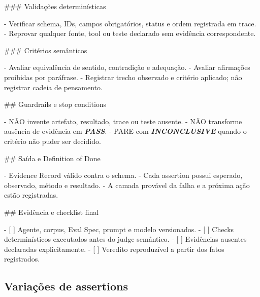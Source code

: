\documentclass[
  10pt,
  a4paper,
  oneside]{book}
\newenvironment{Shaded}{}{}
\newcommand{\FunctionTok}[1]{\textcolor[rgb]{0.02,0.16,0.49}{#1}}
\newcommand{\InformationTok}[1]{\textcolor[rgb]{0.38,0.63,0.69}{\textbf{\textit{#1}}}}
\newcommand{\NormalTok}[1]{#1}
\newcommand{\SpecialStringTok}[1]{\textcolor[rgb]{0.73,0.40,0.53}{#1}}
\newcommand{\VariableTok}[1]{\textcolor[rgb]{0.10,0.09,0.49}{#1}}
\begin{document}
\begin{Shaded}
\begin{Highlighting}[]
\FunctionTok{\#\#\# Validações determinísticas}

\SpecialStringTok{{-} }\NormalTok{Verificar schema, IDs, campos obrigatórios, status e ordem registrada em trace.}
\SpecialStringTok{{-} }\NormalTok{Reprovar qualquer fonte, tool ou teste declarado sem evidência correspondente.}

\FunctionTok{\#\#\# Critérios semânticos}

\SpecialStringTok{{-} }\NormalTok{Avaliar equivalência de sentido, contradição e adequação.}
\SpecialStringTok{{-} }\NormalTok{Avaliar afirmações proibidas por paráfrase.}
\SpecialStringTok{{-} }\NormalTok{Registrar trecho observado e critério aplicado; não registrar cadeia de pensamento.}

\FunctionTok{\#\# Guardrails e stop conditions}

\SpecialStringTok{{-} }\NormalTok{NÃO invente artefato, resultado, trace ou teste ausente.}
\SpecialStringTok{{-} }\NormalTok{NÃO transforme ausência de evidência em }\InformationTok{\textasciigrave{}PASS\textasciigrave{}}\NormalTok{.}
\SpecialStringTok{{-} }\NormalTok{PARE com }\InformationTok{\textasciigrave{}INCONCLUSIVE\textasciigrave{}}\NormalTok{ quando o critério não puder ser decidido.}

\FunctionTok{\#\# Saída e Definition of Done}

\SpecialStringTok{{-} }\NormalTok{Evidence Record válido contra o schema.}
\SpecialStringTok{{-} }\NormalTok{Cada assertion possui esperado, observado, método e resultado.}
\SpecialStringTok{{-} }\NormalTok{A camada provável da falha e a próxima ação estão registradas.}

\FunctionTok{\#\# Evidência e checklist final}

\SpecialStringTok{{-} }\VariableTok{[ ]}\NormalTok{ Agente, corpus, Eval Spec, prompt e modelo versionados.}
\SpecialStringTok{{-} }\VariableTok{[ ]}\NormalTok{ Checks determinísticos executados antes do judge semântico.}
\SpecialStringTok{{-} }\VariableTok{[ ]}\NormalTok{ Evidências ausentes declaradas explicitamente.}
\SpecialStringTok{{-} }\VariableTok{[ ]}\NormalTok{ Veredito reproduzível a partir dos fatos registrados.}
\end{Highlighting}
\end{Shaded}

\hypertarget{variauxe7uxf5es-de-assertions}{%
\subsection{Variações de
assertions}\label{variauxe7uxf5es-de-assertions}}
\end{document}
